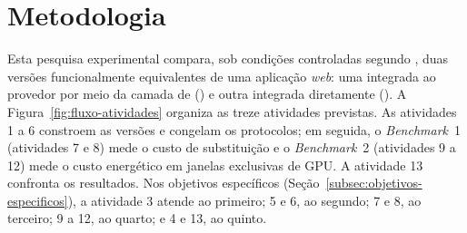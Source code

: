 \chapter{Metodologia}
\label{cap:metodologia}

Esta pesquisa experimental compara, sob condições controladas segundo
, duas versões funcionalmente equivalentes de uma
aplicação \textit{web}: uma integrada ao provedor por meio da camada de
\harness{} (\versaoH) e outra integrada diretamente (\versaoD). A
Figura~\ref{fig:fluxo-atividades} organiza as treze atividades previstas. As
atividades 1 a 6 constroem as versões e congelam os protocolos; em seguida, o
\textit{Benchmark}~1 (atividades 7 e 8) mede o custo de substituição e o
\textit{Benchmark}~2 (atividades 9 a 12) mede o custo energético em janelas
exclusivas de GPU. A atividade 13 confronta os resultados. Nos objetivos
específicos (Seção~\ref{subsec:objetivos-especificos}), a atividade 3 atende ao
primeiro; 5 e 6, ao segundo; 7 e 8, ao terceiro; 9 a 12, ao quarto; e 4 e 13,
ao quinto.

